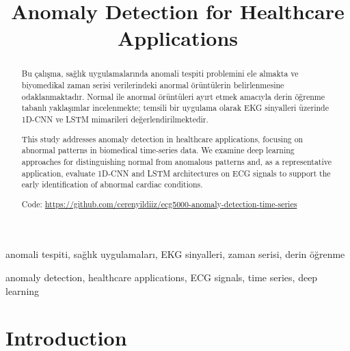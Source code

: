 \documentclass[conference]{IEEEtran}
\begin{document}
\title{Anomaly Detection for Healthcare Applications}

\author{
}

\maketitle

\renewcommand{\abstractname}{Özetçe}
\begin{abstract}
Bu çalışma, sağlık uygulamalarında anomali tespiti problemini ele almakta ve biyomedikal zaman serisi verilerindeki anormal örüntülerin belirlenmesine odaklanmaktadır. Normal ile anormal örüntüleri ayırt etmek amacıyla derin öğrenme tabanlı yaklaşımlar incelenmekte; temsili bir uygulama olarak EKG sinyalleri üzerinde 1D-CNN ve LSTM mimarileri değerlendirilmektedir.
\end{abstract}

\renewcommand{\IEEEkeywordsname}{Anahtar Kelimeler}
\begin{IEEEkeywords}
anomali tespiti, sağlık uygulamaları, EKG sinyalleri, zaman serisi, derin öğrenme
\end{IEEEkeywords}

\renewcommand{\abstractname}{Abstract}
\begin{abstract}
This study addresses anomaly detection in healthcare applications, focusing on abnormal patterns in biomedical time-series data. We examine deep learning approaches for distinguishing normal from anomalous patterns and, as a representative application, evaluate 1D-CNN and LSTM architectures on ECG signals to support the early identification of abnormal cardiac conditions.

Code: \url{https://github.com/cerenyildiiz/ecg5000-anomaly-detection-time-series}
\end{abstract}

\renewcommand{\IEEEkeywordsname}{Keywords}
\begin{IEEEkeywords}
anomaly detection, healthcare applications, ECG signals, time series, deep learning
\end{IEEEkeywords}

\section{Introduction}
\end{document}

